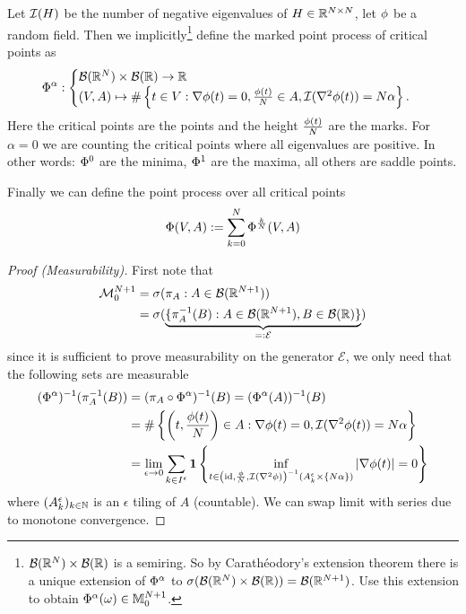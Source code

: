 \begin{definition}
	Let \(\negEV(H)\) be the number of negative eigenvalues of
	\(H\in\real^{\dimension\times\dimension}\), let \(\rf\) be a random field.
	Then we implicitly\footnote{
		\(\borel(\real^\dimension)\times\borel(\real)\) is a semiring. So by
		Carathéodory's extension theorem there is a unique extension of
		\(\crit^\alpha\) to
		\(\sigma(\borel(\real^\dimension)\times\borel(\real))=\borel(\real^{\dimension+1})\).
		Use this extension to obtain \(\crit^\alpha(\omega)\in\locFiniteMeasure[\dimension+1]\).
	} define the marked point process of critical points as
	\begin{align*}
		\crit^\alpha:
		\begin{cases}
			\borel(\real^\dimension)\times\borel(\real) \to \real\\
			(\Vol, A) \mapsto
			\#\left\{t\in\Vol:
				\nabla\rf(t)=0,
				\frac{\rf(t)}{\dimension}\in A,
				\negEV(\nabla^2 \rf(t))=\dimension\alpha
			\right\}.
		\end{cases}
	\end{align*}
	Here the critical points are the points and the height \(\frac{\rf(t)}\dimension\)
	are the marks. For \(\alpha=0\) we are counting the critical points where all
	eigenvalues are positive. In other words: \(\crit^0\) are the minima,
	\(\crit^1\) are the maxima, all others are saddle points.

	Finally we can define the point process over all critical points
	\[
		\crit(\Vol, A)
		:= \sum_{k=0}^\dimension \crit^{\frac{k}\dimension}(\Vol, A)
	\]
\end{definition}
\begin{proof}[Proof (Measurability)]
	First note that	
	\begin{align*}
		\locFiniteMeasAlg[\dimension+1]
		&= \sigma(\pi_A : A\in\borel(\real^{\dimension+1}))\\
		&=\sigma(\underbrace{
			\{\pi_A^{-1}(B) : A\in\borel(\real^{\dimension+1}), B\in\borel(\real)\}
		}_{=:\mathcal{E}}
		)
	\end{align*}
	since it is sufficient to prove measurability on the generator
	\(\mathcal{E}\), we only need that the following sets are measurable
	\begin{align*}
		(\crit^\alpha)^{-1}(\pi^{-1}_{ A }(B))
		&= (\pi_{A} \circ \crit^\alpha)^{-1}(B)
		= (\crit^\alpha(A))^{-1}(B)\\
		&= \#\left\{\left(t,\frac{\rf(t)}{\dimension}\right) \in A:
			\nabla\rf(t)=0,
			\negEV(\nabla^2 \rf(t))=\dimension\alpha
		\right\}\\
		&= \lim_{\epsilon\to 0} \sum_{k\in I^\epsilon}
		\ind\left\{
			\inf_{t\in \left(\text{id}, \frac{\rf}\dimension, \negEV(\nabla^2\rf)\right)^{-1}(A^\epsilon_k\times \{\dimension\alpha\}) }
		|\nabla \rf(t)| = 0
		\right\}
	\end{align*}
	where \((A^\epsilon_k)_{k\in\nat}\) is an \(\epsilon\) tiling of \(A\) (countable).
	We can swap limit with series due to monotone convergence.
\end{proof}

